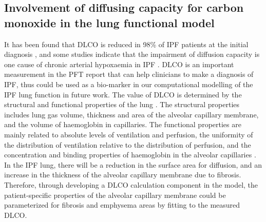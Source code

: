 \subsection{Involvement of diffusing capacity for carbon monoxide in the lung functional model}
It has been found that DLCO is reduced in 98\% of IPF patients at the initial diagnosis \citep{cortes2014idiopathic}, and some studies indicate that the impairment of diffusion capacity is one cause of chronic arterial hypoxaemia in IPF \citep{plantier2018physiology}. DLCO is an important measurement in the PFT report that can help clinicians to make a diagnosis of IPF, thus could be used as a bio-marker in our computational modelling of the IPF lung function in future work. The value of DLCO is determined by the structural and functional properties of the lung \citep{graham20172017}. The structural properties includes lung gas volume, thickness and area of the alveolar capillary membrane, and the volume of haemoglobin in capillaries. The functional properties are mainly related to absolute levels of ventilation and perfusion, the uniformity of the distribution of ventilation relative to the distribution of perfusion, and the concentration and binding properties of haemoglobin in the alveolar capillaries \citep{graham20172017}. In the IPF lung, there will be a reduction in the surface area for diffusion, and an increase in the thickness of the alveolar capillary membrane due to fibrosis. Therefore, through developing a DLCO calculation component in the model, the patient-specific properties of the alveolar capillary membrane could be parameterized for fibrosis and emphysema areas by fitting to the measured DLCO.

